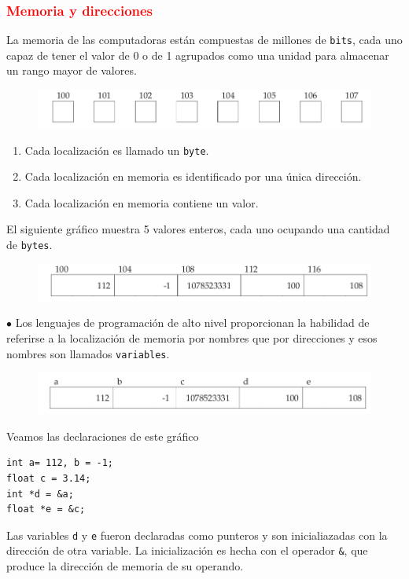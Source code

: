 \documentclass[serif, professionalfont]{beamer}
\newcommand\Fontvi{\fontsize{10}{9.2}\selectfont}
\begin{document}
\begin{frame}[fragile]
	\Fontvi
	\frametitle {\textcolor{red}{\hspace{3.0 cm} Memoria y direcciones}}
	
	La memoria de las computadoras est\'an compuestas de millones de \texttt{bits}, cada uno capaz de tener el valor de 0 o de 1 agrupados como una unidad para almacenar un rango mayor de valores. 
	
	\begin{figure}[h]
		\centering
		\includegraphics[scale=.3]{g1.png}
	\end{figure}
\begin{enumerate}
\item Cada localizaci\'on es llamado un \texttt{byte}.
\item  Cada localizaci\'on en memoria es identificado por una \'unica direcci\'on.
\item  Cada localizaci\'on en memoria contiene un valor.
\end{enumerate}

El siguiente gr\'afico muestra 5 valores enteros, cada uno ocupando una
cantidad de \texttt{bytes}. 

\begin{figure}[htbp]
	\centering
	\includegraphics[scale=.3]{g2.png}
\end{figure}
\end{frame}

\begin{frame}[fragile]{}
	\Fontvi
$\bullet$ Los lenguajes de programaci\'on de alto nivel proporcionan la habilidad de
referirse a la localizaci\'on de memoria por nombres que por direcciones y esos nombres son llamados \texttt{variables}.

\begin{figure}[h]
	\centering
	\includegraphics[scale=.3]{g3.png}
\end{figure}

Veamos las declaraciones de este gr\'afico

\begin{verbatim}
int a= 112, b = -1;
float c = 3.14;
int *d = &a;
float *e = &c;
\end{verbatim}

Las variables \texttt{d} y \texttt{e} fueron declaradas como punteros y son inicialiazadas con la direcci\'on de otra variable. La inicializaci\'on es hecha con el operador \texttt{\&}, que produce la direcci\'on de memoria de su operando. 
\end{frame}
\end{document}
